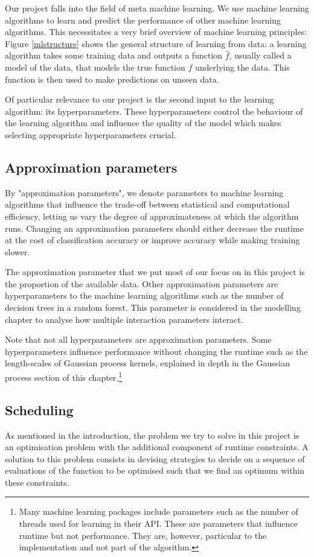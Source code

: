 \documentclass[a4paper,12pt,twoside,openright]{report}
\begin{document}
Our project falls into the field of meta machine learning. We use machine learning algorithms to learn and predict the performance of other machine learning algorithms. This necessitates a very brief overview of machine learning principles: Figure \ref{mlstructure} shows the general structure of learning from data: a learning algorithm takes some training data and outputs a function $\hat{f}$, usually called a model of the data, that models the true function $f$ underlying the data. This function is then used to make predictions on unseen data.

Of particular relevance to our project is the second input to the learning algorithm: its hyperparameters. These hyperparameters control the behaviour of the learning algorithm and influence the quality of the model which makes selecting appropriate hyperparameters crucial.


\subsection{Approximation parameters}
By "approximation parameters", we denote parameters to machine learning algorithms that influence the trade-off between statistical and computational efficiency, letting us vary the degree of approximateness at which the algorithm runs. Changing an approximation parameters should either decrease the runtime at the cost of classification accuracy or improve accuracy while making training slower. 

The approximation parameter that we put most of our focus on in this project is the proportion of the available data. Other approximation parameters are hyperparameters to the machine learning algorithms such as the number of decision trees in a random forest. This parameter is considered in the modelling chapter to analyse how multiple interaction parameters interact.

Note that not all hyperparameters are approximation parameters. Some hyperparameters influence performance without changing the runtime such as the length-scales of Gaussian process kernels, explained in depth in the Gaussian process section of this chapter.\footnote{Many machine learning packages include parameters such as the number of threads used for learning in their API. These are parameters that influence runtime but not performance. They are, however, particular to the implementation and not part of the algorithm.}

\subsection{Scheduling}
As mentioned in the introduction, the problem we try to solve in this project is an optimisation problem with the additional component of runtime constraints. A solution to this problem consists in devising strategies to decide on a sequence of evaluations of the function to be optimised such that we find an optimum within these constraints. 
\end{document}
